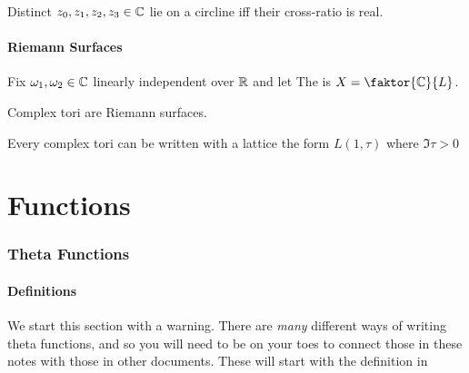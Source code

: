 \documentclass{article}
\begin{document}
\begin{prop}
Distinct $z_0, z_1, z_2, z_3 \in \mathbb{C}$ lie on a circline iff their cross-ratio is real. 
\end{prop}

\subsection{Riemann Surfaces}

\begin{definition}
	Fix $\omega_1, \omega_2 \in \mathbb{C}$ linearly independent over $\mathbb{R}$ and let 
The  is $X = \faktor{\mbb{C}}{L}$. 
\end{definition}

\begin{prop}
	Complex tori are Riemann surfaces. 
\end{prop}

\begin{prop}
	Every complex tori can be written with a lattice the form $L(1,\tau)$ where $\Im\tau > 0$
\end{prop}

\part{Functions}


\section{Theta Functions}
\subsection{Definitions}
We start this section with a warning. There are \emph{many} different ways of writing theta functions, and so you will need to be on your toes to connect those in these notes with those in other documents. These will start with the definition in 
\end{document}
